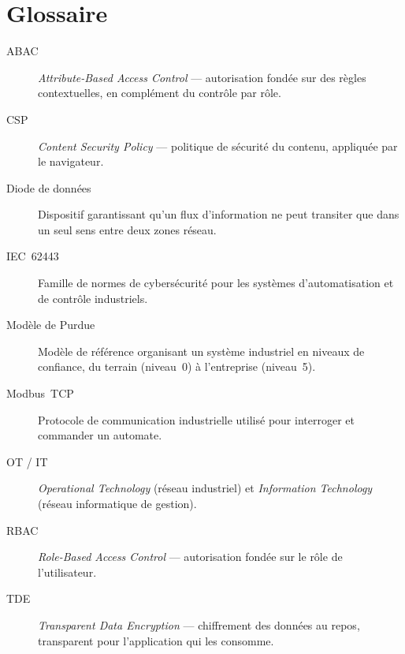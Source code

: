 \documentclass[11pt,a4paper]{report}
\begin{document}
\appendix
\chapter{Glossaire}

\begin{description}
  \item[ABAC] \emph{Attribute-Based Access Control} --- autorisation fondée
    sur des règles contextuelles, en complément du contrôle par rôle.
  \item[CSP] \emph{Content Security Policy} --- politique de sécurité du
    contenu, appliquée par le navigateur.
  \item[Diode de données] Dispositif garantissant qu'un flux d'information ne
    peut transiter que dans un seul sens entre deux zones réseau.
  \item[IEC~62443] Famille de normes de cybersécurité pour les systèmes
    d'automatisation et de contrôle industriels.
  \item[Modèle de Purdue] Modèle de référence organisant un système
    industriel en niveaux de confiance, du terrain (niveau~0) à l'entreprise
    (niveau~5).
  \item[Modbus~TCP] Protocole de communication industrielle utilisé pour
    interroger et commander un automate.
  \item[OT / IT] \emph{Operational Technology} (réseau industriel) et
    \emph{Information Technology} (réseau informatique de gestion).
  \item[RBAC] \emph{Role-Based Access Control} --- autorisation fondée sur le
    rôle de l'utilisateur.
  \item[TDE] \emph{Transparent Data Encryption} --- chiffrement des données
    au repos, transparent pour l'application qui les consomme.
\end{description}
\end{document}

